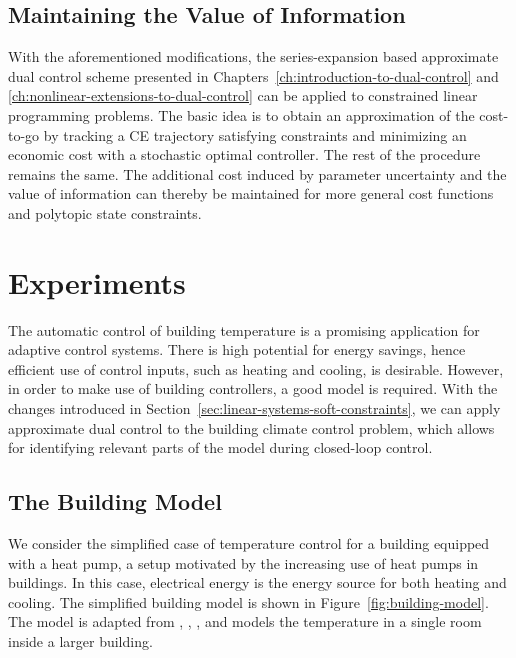\subsection{Maintaining the Value of Information}

With the aforementioned modifications, the series-expansion based approximate
dual control scheme presented in Chapters~\ref{ch:introduction-to-dual-control}
and \ref{ch:nonlinear-extensions-to-dual-control} can be applied to constrained
linear programming problems. The basic idea is to obtain an approximation of the
cost-to-go by tracking a CE trajectory satisfying constraints and minimizing an
economic cost with a stochastic optimal controller. The rest of the procedure
remains the same. The additional cost induced by parameter uncertainty and the
value of information can thereby be maintained for more general cost functions
and polytopic state constraints.

\section{Experiments}
\label{sec:building-climate-control}

The automatic control of building temperature is a promising application for
adaptive control systems. There is high potential for energy savings, hence
efficient use of control inputs, such as heating and cooling, is desirable.
However, in order to make use of building controllers, a good model is
required. With the changes introduced in
Section~\ref{sec:linear-systems-soft-constraints}, we can apply approximate
dual control to the building climate control problem, which allows for
identifying relevant parts of the model during closed-loop control.

\subsection{The Building Model}
\label{sec:building-model}

We
%
%
%
consider the simplified case of temperature control for a building equipped
with a heat pump, a setup motivated by the increasing use of heat pumps in
buildings. In this case, electrical energy is the energy source
for both heating and cooling. The simplified building model is shown in
Figure~\ref{fig:building-model}. The model is adapted from
,
,
, and models the temperature in a
single room
inside a larger building.

